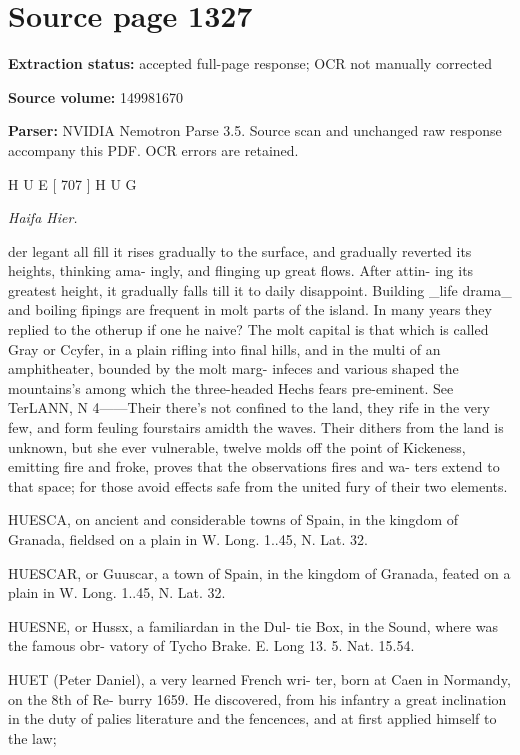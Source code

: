 \clearpage
\section{Source page 1327}
\textbf{Extraction status:} accepted full-page response; OCR not manually corrected\par
\textbf{Source volume:} 149981670\par
\textbf{Parser:} NVIDIA Nemotron Parse 3.5. Source scan and unchanged raw response accompany this PDF. OCR errors are retained.\par\medskip
H U E [ 707 ] H U G\par\medskip
{\small\itshape Haifa
Hier.\par}\medskip
der legant all fill it rises gradually to the surface,
and gradually reverted its heights, thinking ama-
ingly, and flinging up great flows. After attin-
ing its greatest height, it gradually falls till it to
daily disappoint. Building \_life drama\_ and boiling
fipings are frequent in molt parts of the island. In many years they replied to the otherup if one he
naive? The molt capital is that which is called Gray
or Ccyfer, in a plain rifling into final hills, and in the
multi of an amphitheater, bounded by the molt marg-
infeces and various shaped the mountains’s among
which the three-headed Hechs fears pre-eminent. See
TerLANN, N 4——Their there's not confined
to the land, they rife in the very few, and form
feuling fourstairs amidth the waves. Their dithers
from the land is unknown, but she ever vulnerable,
twelve molds off the point of Kickeness, emitting fire
and froke, proves that the observations fires and wa-
ters extend to that space; for those avoid effects safe
from the united fury of their two elements.\par\medskip
HUESCA, on ancient and considerable towns of
Spain, in the kingdom of Granada, fieldsed on a plain in W. Long.
1..45, N. Lat. 32.\par\medskip
HUESCAR, or Guuscar, a town of Spain, in the
kingdom of Granada, feated on a plain in W. Long.
1..45, N. Lat. 32.\par\medskip
HUESNE, or Hussx, a familiardan in the Dul-
tie Box, in the Sound, where was the famous obr-
vatory of Tycho Brake. E. Long 13. 5. Nat.
15.54.\par\medskip
HUET (Peter Daniel), a very learned French wri-
ter, born at Caen in Normandy, on the 8th of Re-
burry 1659. He discovered, from his infantry a
great inclination in the duty of palies literature and
the fencences, and at first applied himself to the law;
